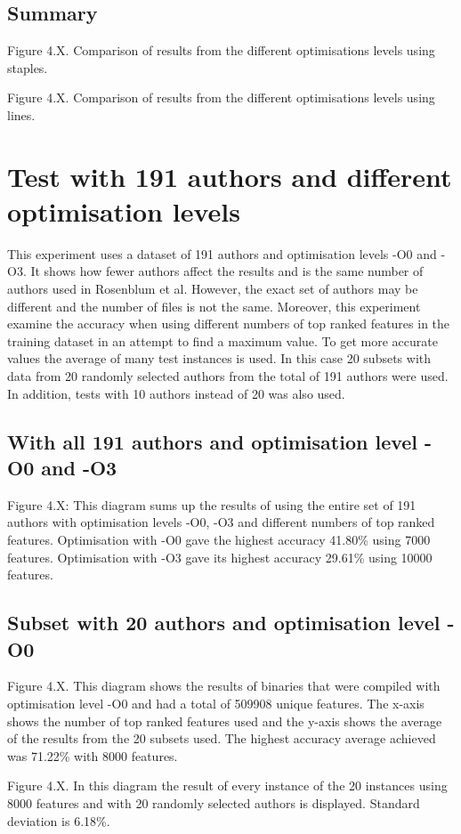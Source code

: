 \documentclass[a4paper,11pt]{kth-mag}
\begin{document}
\subsection{Summary}
Figure 4.X. Comparison of results from the different optimisations levels using
staples.  

Figure 4.X. Comparison of results from the different optimisations levels using
lines.  

\section{Test with 191 authors and different optimisation levels}
This experiment uses a dataset of 191 authors and optimisation levels -O0 and
-O3. It shows how fewer authors affect the results and is the same number of
authors used in Rosenblum et al. However, the exact set of authors may be
different and the number of files is not the same. Moreover, this experiment
examine the accuracy when using different numbers of top ranked features in the
training dataset in an attempt to find a maximum value. To get more accurate
values the average of many test instances is used. In this case 20 subsets with
data from 20 randomly selected authors from the total of 191 authors were used.
In addition, tests with 10 authors instead of 20 was also used.  

\subsection{With all 191 authors and optimisation level -O0 and -O3}
Figure 4.X: This diagram sums up the results of using the entire set of 191
authors with optimisation levels -O0, -O3 and different numbers of top ranked
features. Optimisation with -O0 gave the highest accuracy 41.80\% using 7000
features. Optimisation with -O3 gave its highest accuracy 29.61\% using 10000
features. 

\subsection{Subset with 20 authors and optimisation level -O0}
Figure 4.X. This diagram shows the results of binaries that were compiled with
optimisation level -O0 and had a total of 509908 unique features. The x-axis
shows the number of top ranked features used  and the y-axis shows the average
of the results from the 20 subsets used. The highest accuracy average achieved
was 71.22\% with 8000 features.

Figure 4.X.  In this diagram the result of every instance of the 20 instances
using 8000 features and with 20 randomly selected authors is displayed.
Standard deviation is 6.18\%.
\end{document}
